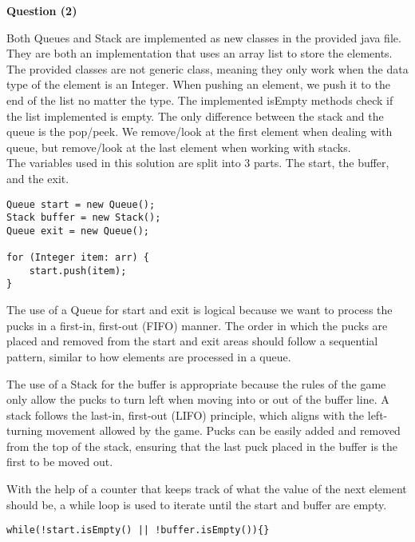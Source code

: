 \documentclass{article}
\begin{document}
\pagebreak

\begin{large}
\textbf{Question (2)}
\end{large}

Both Queues and Stack are implemented as new classes in the provided java file.\\
They are both an implementation that uses an array list to store the elements. The provided classes are not generic class, meaning they only work when the data type of the element is an Integer. When pushing an element, we push it to the end of the list no matter the type. The implemented isEmpty methods check if the list implemented is empty. The only difference between the stack and the queue is the pop/peek. We remove/look at the first element when dealing with queue, but remove/look at the last element when working with stacks.
\\

The variables used in this solution are split into 3 parts. The start, the buffer, and the exit.

\begin{lstlisting}
Queue start = new Queue();
Stack buffer = new Stack();
Queue exit = new Queue();
    	
for (Integer item: arr) {
    start.push(item);
}
\end{lstlisting}

The use of a Queue for start and exit is logical because we want to process the pucks in a first-in, first-out (FIFO) manner. The order in which the pucks are placed and removed from the start and exit areas should follow a sequential pattern, similar to how elements are processed in a queue.

The use of a Stack for the buffer is appropriate because the rules of the game only allow the pucks to turn left when moving into or out of the buffer line. A stack follows the last-in, first-out (LIFO) principle, which aligns with the left-turning movement allowed by the game. Pucks can be easily added and removed from the top of the stack, ensuring that the last puck placed in the buffer is the first to be moved out.

With the help of a counter that keeps track of what the value of the next element should be, a while loop is used to iterate until the start and buffer are empty.

\begin{lstlisting}
while(!start.isEmpty() || !buffer.isEmpty()){}
\end{lstlisting}
\end{document}
